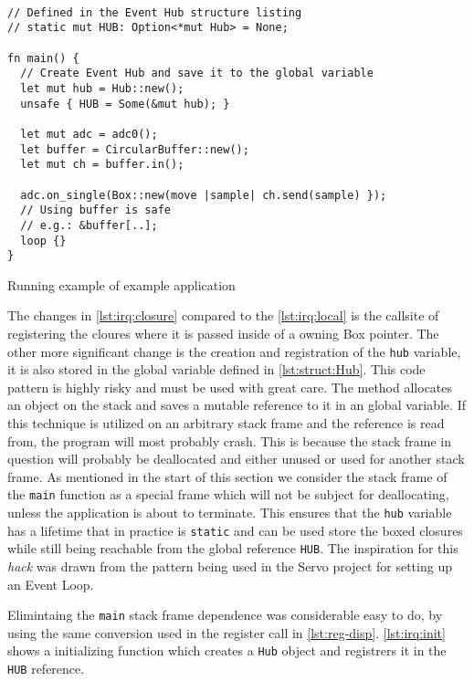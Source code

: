 \begin{listing}[H]
  \begin{verbatim}

// Defined in the Event Hub structure listing
// static mut HUB: Option<*mut Hub> = None;

fn main() {
  // Create Event Hub and save it to the global variable
  let mut hub = Hub::new();
  unsafe { HUB = Some(&mut hub); }

  let mut adc = adc0();
  let buffer = CircularBuffer::new();
  let mut ch = buffer.in();

  adc.on_single(Box::new(move |sample| ch.send(sample) });
  // Using buffer is safe
  // e.g.: &buffer[..];
  loop {}
}
  \end{verbatim}
  \caption{Running example of example application}
  \label{lst:irq:closure}
\end{listing}

The changes in \autoref{lst:irq:closure} compared to the \autoref{lst:irq:local} is the callsite of registering the cloures where it is passed inside of a owning Box pointer. 
The other more significant change is the creation and registration of the \texttt{hub} variable, it is also stored in the global variable defined in \autoref{lst:struct:Hub}.
This code pattern is highly risky and must be used with great care.
The method allocates an object on the stack and saves a mutable reference to it in an global variable.
If this technique is utilized on an arbitrary stack frame and the reference is read from, the program will most probably crash.
This is because the stack frame in question will probably be deallocated and either unused or used for another stack frame.
As mentioned in the start of this section we consider the stack frame of the \texttt{main} function as a special frame which will not be subject for deallocating, unless the application is about to terminate.
This ensures that the \texttt{hub} variable has a lifetime that in practice is \texttt{static} and can be used store the boxed closures while still being reachable from the global reference \texttt{HUB}.
The inspiration for this \textit{hack} was drawn from the pattern being used in the Servo \cite{web:servo} project for setting up an Event Loop.

Elimintaing the \texttt{main} stack frame dependence was considerable easy to do, by using the same conversion used in the register call in \autoref{lst:reg-disp}.
\autoref{lst:irq:init} shows a initializing function which creates a \texttt{Hub} object and registrers it in the \texttt{HUB} reference.

